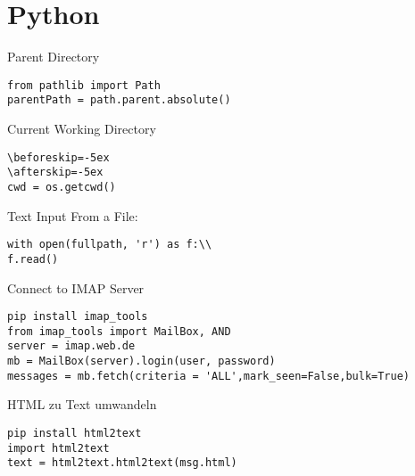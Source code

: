 \chapter{Python}\label{chap:Python}
Parent Directory
\begin{verbatim}
from pathlib import Path
parentPath = path.parent.absolute()
\end{verbatim}
Current Working Directory
\begin{verbatim}
\beforeskip=-5ex
\afterskip=-5ex
cwd = os.getcwd()
\end{verbatim}
Text Input From a File:
\begin{verbatim}
with open(fullpath, 'r') as f:\\
f.read()
\end{verbatim}
Connect to IMAP Server
\begin{verbatim}
pip install imap_tools
from imap_tools import MailBox, AND
server = imap.web.de
mb = MailBox(server).login(user, password)
messages = mb.fetch(criteria = 'ALL',mark_seen=False,bulk=True)
\end{verbatim}
HTML zu Text umwandeln
\begin{verbatim}
pip install html2text
import html2text
text = html2text.html2text(msg.html)
\end{verbatim}